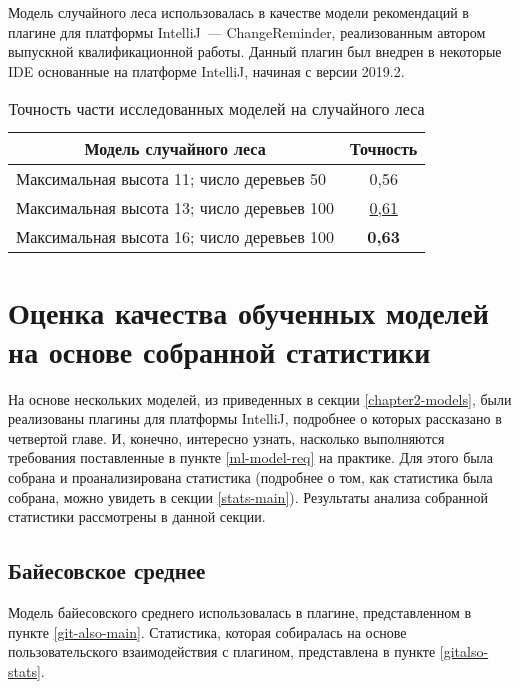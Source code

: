 Модель случайного леса использовалась в качестве модели рекомендаций в плагине для платформы IntelliJ~--- ChangeReminder, реализованным автором выпускной квалификационной работы. Данный плагин был внедрен в некоторые IDE основанные на платформе IntelliJ, начиная с версии 2019.2.
        \begin{table}[!h]
        \caption{Точность части исследованных моделей на случайного леса}\label{rf-offline-result-table}
        \centering
        \begin{tabular}{|l|c|}\hline
        \multicolumn{1}{|c|}{\textbf{Модель случайного леса}} & \textbf{Точность}\\\hline
        Максимальная высота 11; число деревьев 50 & 0,56\\\hline
        Максимальная высота 13; число деревьев 100 & \uline{0,61} \\\hline
        Максимальная высота 16; число деревьев 100  & \textbf{0,63} \\\hline
        \end{tabular}
        \end{table}

\section{Оценка качества обученных моделей на основе собранной статистики}
На основе нескольких моделей, из приведенных в секции \ref{chapter2-models}, были реализованы плагины для платформы IntelliJ, подробнее о которых рассказано в четвертой главе. И, конечно, интересно узнать, насколько выполняются требования поставленные в пункте \ref{ml-model-req} на практике. Для этого была собрана и проанализирована статистика (подробнее о том, как статистика была собрана, можно увидеть в секции \ref{stats-main}). Результаты анализа собранной статистики рассмотрены в данной секции.
    \subsection{Байесовское среднее}\label{bayes-quality-online}
Модель байесовского среднего использовалась в плагине, представленном в пункте \ref{git-also-main}. Статистика, которая собиралась на основе пользовательского взаимодействия с плагином, представлена в пункте \ref{gitalso-stats}.

